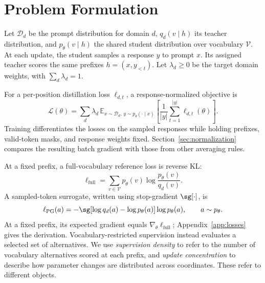 \section{Problem Formulation}
\label{sec:setting}

Let $\mathcal D_d$ be the prompt distribution for domain $d$, $q_d(v\mid h)$ its teacher distribution, and $p_\theta(v\mid h)$ the shared student distribution over vocabulary $\mathcal V$. At each update, the student samples a response $y$ to prompt $x$. Its assigned teacher scores the same prefixes $h=(x,y_{<t})$. Let $\lambda_d\geq0$ be the target domain weights, with $\sum_d\lambda_d=1$.

For a per-position distillation loss $\ell_{d,t}$, a response-normalized objective is
\begin{equation}
\mathcal L(\theta)=\sum_d\lambda_d\,
\mathbb E_{x\sim\mathcal D_d,\,y\sim p_\theta(\cdot\mid x)}
\left[\frac{1}{|y|}\sum_{t=1}^{|y|}\ell_{d,t}(\theta)\right].
\label{eq:mopd}
\end{equation}
Training differentiates the losses on the sampled responses while holding prefixes, valid-token masks, and response weights fixed. Section~\ref{sec:normalization} compares the resulting batch gradient with those from other averaging rules.

At a fixed prefix, a full-vocabulary reference loss is reverse KL:
\begin{equation}
\ell_{\mathrm{full}}=\sum_{v\in\mathcal V}p_\theta(v)\log\frac{p_\theta(v)}{q_d(v)}.
\label{eq:full}
\end{equation}
A sampled-token surrogate, written using stop-gradient $\sg[\cdot]$, is
\begin{equation}
\ell_{\mathrm{PG}}(a)=-\sg[\log q_d(a)-\log p_\theta(a)]\log p_\theta(a),
\qquad a\sim p_\theta.
\label{eq:pg}
\end{equation}
At a fixed prefix, its expected gradient equals $\nabla_\theta\ell_{\mathrm{full}}$; Appendix~\ref{app:losses} gives the derivation. Vocabulary-restricted supervision instead evaluates a selected set of alternatives. We use \emph{supervision density} to refer to the number of vocabulary alternatives scored at each prefix, and \emph{update concentration} to describe how parameter changes are distributed across coordinates. These refer to different objects.
